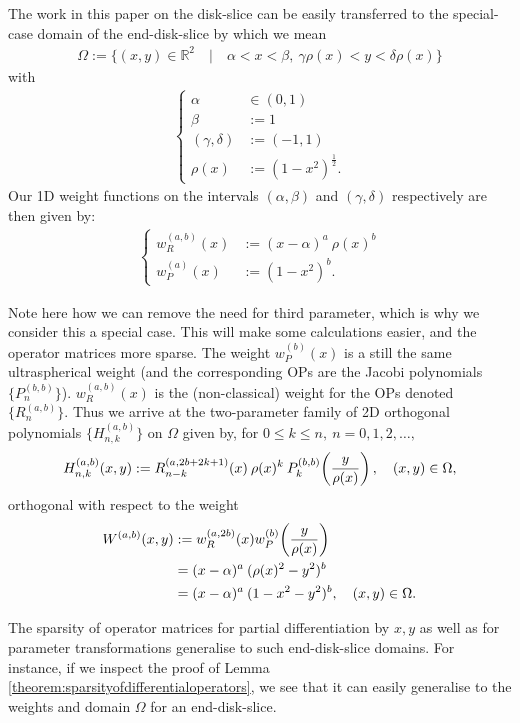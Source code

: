 \documentclass[11pt, oneside]{article}   	%
\newcommand{\half}{\frac{1}{2}}
\newcommand{\R}{\mathbb{R}}
\newcommand{\hdop}{H}
\newcommand{\hdopnkab}{\hdop_{n,k}^{(a,b)}}
\newcommand{\Wab}{{W^{(a,b)}}}
\newcommand{\jac}{{P}}
\newcommand{\genjac}{R}
\newcommand{\genjacnmk}{\genjac_{n-k}}
\newcommand{\genjacw}{w_\genjac}
\newcommand{\jacw}{w_P}
\begin{document}
The work in this paper on the disk-slice can be easily transferred to the special-case domain of the end-disk-slice by which we mean
\begin{align*}
	\Omega := \{(x,y) \in \R^2 \quad | \quad \alpha < x < \beta, \: \gamma \rho(x) < y < \delta \rho(x)\}
\end{align*}
with
\begin{align*}
\begin{cases}
\alpha &\in (0,1) \\
\beta &:= 1 \\
(\gamma, \delta) &:= (-1,1) \\
\rho(x) &:= (1-x^2)^{\half}.
\end{cases}
\end{align*}
Our 1D weight functions on the intervals $(\alpha, \beta)$ and $(\gamma, \delta)$ respectively are then given by:
\begin{align*}
\begin{cases}
\genjacw^{(a,b)}(x) &:= (x - \alpha)^{a} \: \rho(x)^{b} \\
\jacw^{(a)}(x) &:= (1-x^2)^b.
\end{cases}
\end{align*}

Note here how we can remove the need for third parameter, which is why we consider this a special case. This will make some calculations easier, and the operator matrices more sparse. The weight $\jacw^{(b)}(x)$ is a still the same ultraspherical weight (and the corresponding OPs are the Jacobi polynomials $\{\jac_n^{(b, b)}\}$). $\genjacw^{(a,b)}(x)$ is the (non-classical) weight for the OPs denoted $\{\genjac_n^{(a,b)}\}$. Thus we arrive at the two-parameter family of 2D orthogonal polynomials $\{\hdopnkab\}$ on $\Omega$ given by, for \(0 \le k \le n, \: n = 0,1,2,\dots,\)
\begin{align*}
	\hdopnkab(x,y) := \genjacnmk^{(a, 2b+2k+1)}(x) \: \rho(x)^k \: \jac_k^{(b,b)}\fpr(\frac{y}{\rho(x)}), \quad (x,y) \in \Omega, 
\end{align*}
orthogonal with respect to the weight
\begin{align*}
	\Wab(x,y) &:= \genjacw^{(a,2b)}(x) w^{(b)}_P\fpr(\frac{y}{\rho(x)}) \nonumber \\
	&= (x - \alpha)^{a} \: (\rho(x)^2 -y^2)^b \nonumber \\
	&= (x - \alpha)^{a} \: (1 - x^2 -y^2)^b , \quad (x,y) \in \Omega.
\end{align*}

The sparsity of operator matrices for partial differentiation by $x, y$ as well as for parameter transformations generalise to such end-disk-slice domains. For instance, if we inspect the proof of Lemma \ref{theorem:sparsityofdifferentialoperators}, we see that it can easily generalise to the weights and domain $\Omega$ for an end-disk-slice.




\end{document}
